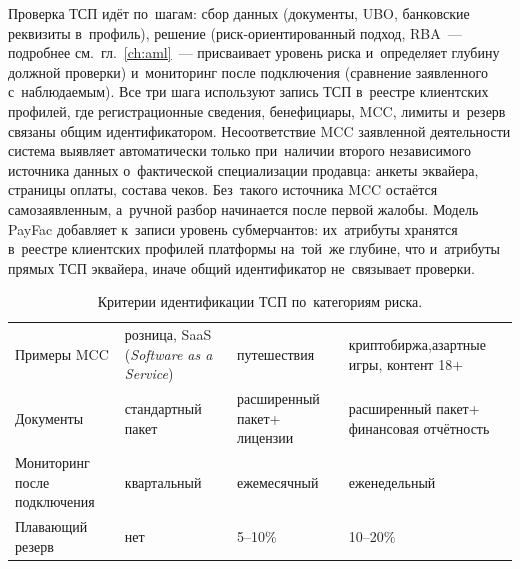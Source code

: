 
Проверка ТСП идёт по~шагам: сбор данных (документы, UBO, банковские
реквизиты в~профиль), решение (риск-ориентированный подход, RBA~---
  подробнее см.~гл.~\ref{ch:aml}~--- присваивает уровень риска и~определяет
глубину должной проверки) и~мониторинг после подключения (сравнение заявленного
с~наблюдаемым). Все три шага используют запись ТСП в~реестре клиентских профилей, где регистрационные
сведения, бенефициары, MCC, лимиты и~резерв связаны общим идентификатором.
Несоответствие MCC заявленной деятельности система выявляет автоматически
только при~наличии второго независимого источника данных о~фактической
специализации продавца: анкеты эквайера, страницы оплаты, состава чеков.
Без~такого источника MCC остаётся самозаявленным, а~ручной разбор начинается
после первой жалобы. Модель PayFac добавляет к~записи уровень субмерчантов:
их~атрибуты хранятся в~реестре клиентских профилей платформы на~той~же глубине, что и~атрибуты прямых
ТСП эквайера, иначе общий идентификатор не~связывает проверки.

\begin{table}[H]
  \caption{Критерии идентификации ТСП по~категориям риска.}\label{tab:kyb-risk}
  \begingroup
  \tablesetup
  \begin{minipage}{\textwidth}
    \begin{tabularx}{\textwidth}{
        @{}B{0.18\textwidth}
        Y
        Y
        Y@{}
      }
      \toprule
      \headrow
       &
       &
       &
       \\
      \midrule
      Примеры MCC &
      розница, SaaS (\textit{Software as a Service}) &
      путешествия &
      криптобиржа,\newline азартные игры, контент 18+ \\
      \rowsep
      Документы &
      стандартный пакет &
      расширенный пакет\newline + лицензии &
      расширенный пакет\newline + финансовая отчётность \\
      \rowsep
      Мониторинг после подключения &
      квартальный &
      ежемесячный &
      еженедельный \\
      \rowsep
      Плавающий резерв &
      нет &
      5--10\% &
      10--20\% \\
      \bottomrule
    \end{tabularx}
  \end{minipage}\par
  \endgroup
\end{table}

